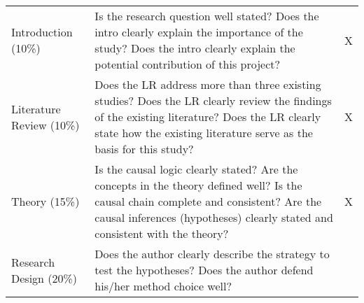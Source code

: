 \documentclass[11pt,]{article}
\theoremstyle{definition}
\theoremstyle{definition}
\theoremstyle{remark}
\begin{document}
\begin{longtable}[]{@{}lll@{}}
\begin{minipage}[t]{0.12\columnwidth}\raggedright\strut
Introduction (10\%)\strut
\end{minipage} & \begin{minipage}[t]{0.76\columnwidth}\raggedright\strut
Is the research question well stated? Does the intro clearly explain the
importance of the study? Does the intro clearly explain the potential
contribution of this project?\strut
\end{minipage} & \begin{minipage}[t]{0.03\columnwidth}\raggedright\strut
X\strut
\end{minipage}\tabularnewline
\begin{minipage}[t]{0.12\columnwidth}\raggedright\strut
Literature Review (10\%)\strut
\end{minipage} & \begin{minipage}[t]{0.76\columnwidth}\raggedright\strut
Does the LR address more than three existing studies? Does the LR
clearly review the findings of the existing literature? Does the LR
clearly state how the existing literature serve as the basis for this
study?\strut
\end{minipage} & \begin{minipage}[t]{0.03\columnwidth}\raggedright\strut
X\strut
\end{minipage}\tabularnewline
\begin{minipage}[t]{0.12\columnwidth}\raggedright\strut
Theory (15\%)\strut
\end{minipage} & \begin{minipage}[t]{0.76\columnwidth}\raggedright\strut
Is the causal logic clearly stated? Are the concepts in the theory
defined well? Is the causal chain complete and consistent? Are the
causal inferences (hypotheses) clearly stated and consistent with the
theory?\strut
\end{minipage} & \begin{minipage}[t]{0.03\columnwidth}\raggedright\strut
X\strut
\end{minipage}\tabularnewline
\begin{minipage}[t]{0.12\columnwidth}\raggedright\strut
Research Design (20\%)\strut
\end{minipage} & \begin{minipage}[t]{0.76\columnwidth}\raggedright\strut
Does the author clearly describe the strategy to test the hypotheses?
Does the author defend his/her method choice well?\strut
\end{minipage} & \begin{minipage}[t]{0.03\columnwidth}\raggedright\strut

\end{minipage}
\end{longtable}
\end{document}
